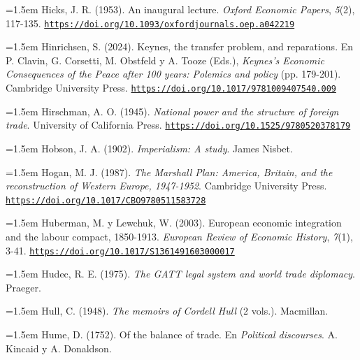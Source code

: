 \documentclass[10pt,a4paper]{article}
\begin{document}
{\sloppy\noindent\hangindent=1.5em Hicks, J. R. (1953). An inaugural lecture. \textit{Oxford Economic Papers}, \textit{5}(2), 117-135. \href{https://doi.org/10.1093/oxfordjournals.oep.a042219}{\nolinkurl{https://doi.org/10.1093/oxfordjournals.oep.a042219}}\par}

{\sloppy\noindent\hangindent=1.5em Hinrichsen, S. (2024). Keynes, the transfer problem, and reparations. En P. Clavin, G. Corsetti, M. Obstfeld y A. Tooze (Eds.), \textit{Keynes's Economic Consequences of the Peace after 100 years: Polemics and policy} (pp. 179-201). Cambridge University Press. \href{https://doi.org/10.1017/9781009407540.009}{\nolinkurl{https://doi.org/10.1017/9781009407540.009}}\par}

{\sloppy\noindent\hangindent=1.5em Hirschman, A. O. (1945). \textit{National power and the structure of foreign trade}. University of California Press. \href{https://doi.org/10.1525/9780520378179}{\nolinkurl{https://doi.org/10.1525/9780520378179}}\par}

\noindent\hangindent=1.5em Hobson, J. A. (1902). \textit{Imperialism: A study}. James Nisbet.

{\sloppy\noindent\hangindent=1.5em Hogan, M. J. (1987). \textit{The Marshall Plan: America, Britain, and the reconstruction of Western Europe, 1947-1952}. Cambridge University Press. \href{https://doi.org/10.1017/CBO9780511583728}{\nolinkurl{https://doi.org/10.1017/CBO9780511583728}}\par}

{\sloppy\noindent\hangindent=1.5em Huberman, M. y Lewchuk, W. (2003). European economic integration and the labour compact, 1850-1913. \textit{European Review of Economic History}, \textit{7}(1), 3-41. \href{https://doi.org/10.1017/S1361491603000017}{\nolinkurl{https://doi.org/10.1017/S1361491603000017}}\par}

{\sloppy\noindent\hangindent=1.5em Hudec, R. E. (1975). \textit{The GATT legal system and world trade diplomacy}. Praeger.\par}

\noindent\hangindent=1.5em Hull, C. (1948). \textit{The memoirs of Cordell Hull} (2 vols.). Macmillan.

\noindent\hangindent=1.5em Hume, D. (1752). Of the balance of trade. En \textit{Political discourses}. A. Kincaid y A. Donaldson.
\end{document}

